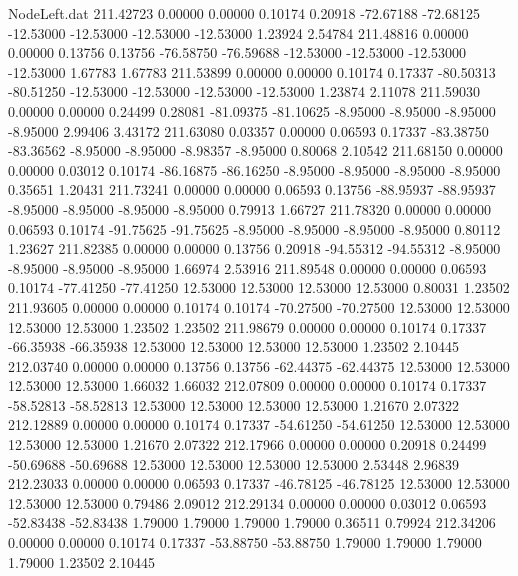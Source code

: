 \begin{filecontents}{NodeLeft.dat}
 211.42723    0.00000    0.00000     0.10174    0.20918  -72.67188  -72.68125  -12.53000  -12.53000  -12.53000  -12.53000    1.23924    2.54784
 211.48816    0.00000    0.00000     0.13756    0.13756  -76.58750  -76.59688  -12.53000  -12.53000  -12.53000  -12.53000    1.67783    1.67783
 211.53899    0.00000    0.00000     0.10174    0.17337  -80.50313  -80.51250  -12.53000  -12.53000  -12.53000  -12.53000    1.23874    2.11078
 211.59030    0.00000    0.00000     0.24499    0.28081  -81.09375  -81.10625   -8.95000   -8.95000   -8.95000   -8.95000    2.99406    3.43172
 211.63080    0.03357    0.00000     0.06593    0.17337  -83.38750  -83.36562   -8.95000   -8.95000   -8.98357   -8.95000    0.80068    2.10542
 211.68150    0.00000    0.00000     0.03012    0.10174  -86.16875  -86.16250   -8.95000   -8.95000   -8.95000   -8.95000    0.35651    1.20431
 211.73241    0.00000    0.00000     0.06593    0.13756  -88.95937  -88.95937   -8.95000   -8.95000   -8.95000   -8.95000    0.79913    1.66727
 211.78320    0.00000    0.00000     0.06593    0.10174  -91.75625  -91.75625   -8.95000   -8.95000   -8.95000   -8.95000    0.80112    1.23627
 211.82385    0.00000    0.00000     0.13756    0.20918  -94.55312  -94.55312   -8.95000   -8.95000   -8.95000   -8.95000    1.66974    2.53916
 211.89548    0.00000    0.00000     0.06593    0.10174  -77.41250  -77.41250   12.53000   12.53000   12.53000   12.53000    0.80031    1.23502
 211.93605    0.00000    0.00000     0.10174    0.10174  -70.27500  -70.27500   12.53000   12.53000   12.53000   12.53000    1.23502    1.23502
 211.98679    0.00000    0.00000     0.10174    0.17337  -66.35938  -66.35938   12.53000   12.53000   12.53000   12.53000    1.23502    2.10445
 212.03740    0.00000    0.00000     0.13756    0.13756  -62.44375  -62.44375   12.53000   12.53000   12.53000   12.53000    1.66032    1.66032
 212.07809    0.00000    0.00000     0.10174    0.17337  -58.52813  -58.52813   12.53000   12.53000   12.53000   12.53000    1.21670    2.07322
 212.12889    0.00000    0.00000     0.10174    0.17337  -54.61250  -54.61250   12.53000   12.53000   12.53000   12.53000    1.21670    2.07322
 212.17966    0.00000    0.00000     0.20918    0.24499  -50.69688  -50.69688   12.53000   12.53000   12.53000   12.53000    2.53448    2.96839
 212.23033    0.00000    0.00000     0.06593    0.17337  -46.78125  -46.78125   12.53000   12.53000   12.53000   12.53000    0.79486    2.09012
 212.29134    0.00000    0.00000     0.03012    0.06593  -52.83438  -52.83438    1.79000    1.79000    1.79000    1.79000    0.36511    0.79924
 212.34206    0.00000    0.00000     0.10174    0.17337  -53.88750  -53.88750    1.79000    1.79000    1.79000    1.79000    1.23502    2.10445

\end{filecontents}
